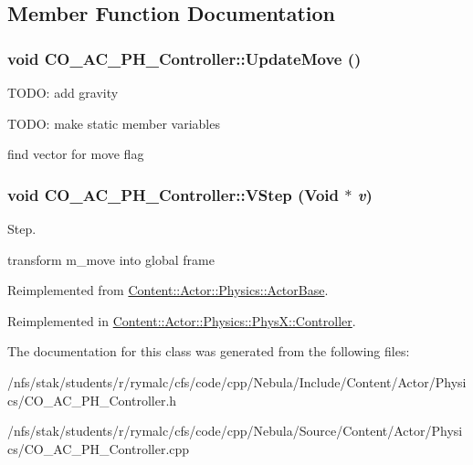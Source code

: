 \subsection{Member Function Documentation}
\hypertarget{classContent_1_1Actor_1_1Physics_1_1Controller_ab4cd228690c0077a92fb52466853c191}{
\subsubsection[{UpdateMove}]{\setlength{\rightskip}{0pt plus 5cm}void CO\_\-AC\_\-PH\_\-Controller::UpdateMove ()}}
\label{classContent_1_1Actor_1_1Physics_1_1Controller_ab4cd228690c0077a92fb52466853c191}


TODO: add gravity

TODO: make static member variables

find vector for move flag \hypertarget{classContent_1_1Actor_1_1Physics_1_1Controller_a316b3776da05a4c7eb80242309a7b81d}{
\subsubsection[{VStep}]{\setlength{\rightskip}{0pt plus 5cm}void CO\_\-AC\_\-PH\_\-Controller::VStep ({\bf Void} $\ast$ {\em v})}}
\label{classContent_1_1Actor_1_1Physics_1_1Controller_a316b3776da05a4c7eb80242309a7b81d}


Step. 

transform m\_\-move into global frame 

Reimplemented from \hyperlink{classContent_1_1Actor_1_1Physics_1_1ActorBase_ad454f098f093dbd15fa04939c0ad11c8}{Content::Actor::Physics::ActorBase}.

Reimplemented in \hyperlink{classContent_1_1Actor_1_1Physics_1_1PhysX_1_1Controller_a7cd6df8141a2d4ec1023558e0b75c80b}{Content::Actor::Physics::PhysX::Controller}.

The documentation for this class was generated from the following files:\begin{DoxyCompactItemize}
\item 
/nfs/stak/students/r/rymalc/cfs/code/cpp/Nebula/Include/Content/Actor/Physics/CO\_\-AC\_\-PH\_\-Controller.h\item 
/nfs/stak/students/r/rymalc/cfs/code/cpp/Nebula/Source/Content/Actor/Physics/CO\_\-AC\_\-PH\_\-Controller.cpp\end{DoxyCompactItemize}
